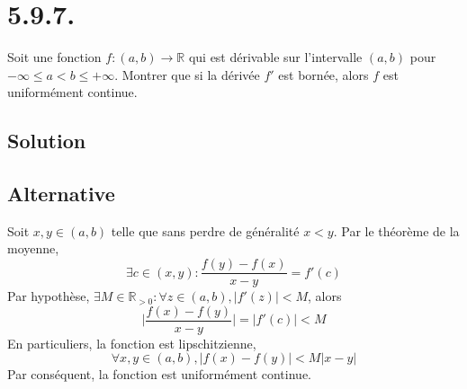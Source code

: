 \section*{5.9.7.}
	Soit une fonction $f:(a,b)\longrightarrow\mathbb{R}$ qui est dérivable sur l'intervalle $(a,b)$ pour $-\infty\leq a<b\leq +\infty$. Montrer que si la dérivée $f'$ est bornée, alors $f$ est uniformément continue.
	\subsection*{Solution}
			\subsection*{Alternative}
			Soit $x,y\in (a,b)$ telle que sans perdre de généralité $x<y$. Par le théorème de la moyenne,\[\exists c\in (x,y) : \frac{f(y)-f(x)}{x-y}=f'(c) \]
			Par hypothèse, $\exists M\in\mathbb{R}_{>0} : \forall z\in (a,b ),|f'(z)|< M$, alors
			\[\bigg|\frac{f(x)-f(y)}{x-y}\bigg|=|f'(c)|<M\]
			En particuliers, la fonction est lipschitzienne,
			\[\forall x,y\in (a,b), |f(x)-f(y)|<M|x-y|\]
			Par conséquent, la fonction est uniformément continue.